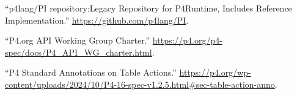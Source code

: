 \documentclass[11pt]{article}
\begin{document}
{{\begin{thebibliography}{45}
\mdbibitemlabel{{}[20]}\textquotedblleft{}p4lang/PI repository:Legacy Repository for P4Runtime, Includes Reference Implementation.\textquotedblright{} \href{https://github.com/p4lang/PI}{{\ttfamily https://\hspace{0pt}github.\hspace{0pt}com/\hspace{0pt}p4lang/\hspace{0pt}PI}}.\label{pirepo}%

\mdbibitemlabel{{}[21]}\textquotedblleft{}P4.org API Working Group Charter.\textquotedblright{} \href{https://p4.org/p4-spec/docs/P4_API_WG_charter.html}{{\ttfamily https://\hspace{0pt}p4.\hspace{0pt}org/\hspace{0pt}p4-\hspace{0pt}spec/\hspace{0pt}docs/\hspace{0pt}P4\_\hspace{0pt}API\_\hspace{0pt}WG\_\hspace{0pt}charter.\hspace{0pt}html}}.\label{p4apiwgcharter}%

\mdbibitemlabel{{}[22]}\textquotedblleft{}P4 Standard Annotations on Table Actions.\textquotedblright{} \href{https://p4.org/wp-content/uploads/2024/10/P4-16-spec-v1.2.5.html\%23sec-table-action-anno}{{\ttfamily https://\hspace{0pt}p4.\hspace{0pt}org/\hspace{0pt}wp-\hspace{0pt}content/\hspace{0pt}uploads/\hspace{0pt}2024/\hspace{0pt}10/\hspace{0pt}P4-\hspace{0pt}16-\hspace{0pt}spec-\hspace{0pt}v1.\hspace{0pt}2.\hspace{0pt}5.\hspace{0pt}html\#\hspace{0pt}sec-\hspace{0pt}table-\hspace{0pt}action-\hspace{0pt}anno}}.\label{p4actionannotations}%


\end{thebibliography}}}
\end{document}
